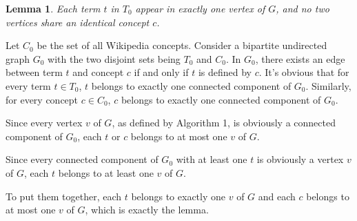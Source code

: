 \documentclass[letterpaper]{article}
\newtheorem{lemma}{Lemma}
\begin{document}
\begin{lemma}
Each term $t$ in $T_0$ appear in exactly one vertex of $G$, and no two vertices share an identical concept $c$.
\end{lemma}

Let $C_0$ be the set of all Wikipedia concepts. Consider a bipartite undirected graph $G_0$ with the two disjoint sets being $T_0$ and $C_0$. In $G_0$, there exists an edge between term $t$ and concept $c$ if and only if $t$ is defined by $c$. It's obvious that for every term $t\in T_0$, $t$ belongs to exactly one connected component of $G_0$. Similarly, for every concept $c\in C_0$, $c$ belongs to exactly one connected component of $G_0$.

Since every vertex $v$ of $G$, as defined by Algorithm 1, is obviously a connected component of $G_0$, each $t$ or $c$ belongs to at most one $v$ of $G$.

Since every connected component of $G_0$ with at least one $t$ is obviously a vertex $v$ of $G$, each $t$ belongs to at least one $v$ of $G$.

To put them together, each $t$ belongs to exactly one $v$ of $G$ and each $c$ belongs to at most one $v$ of $G$, which is exactly the lemma.
\end{document}
